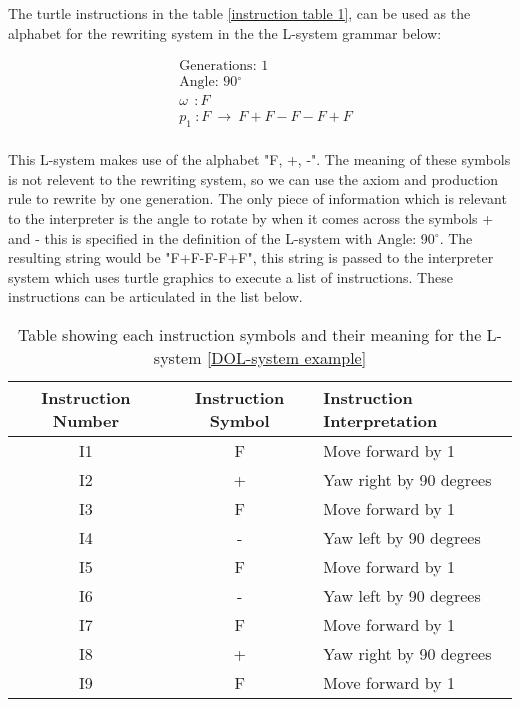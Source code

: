\begin{flushleft}
\vspace{5mm}

The turtle instructions in the table \ref{instruction table 1}, can be used as the alphabet for the rewriting system in the the L-system grammar below:

\begin{equation} \label{DOL-system example}
\begin{aligned}
	&\text{Generations: 1}\\
	&\text{Angle: 90$^{\circ}$}\\
	&\omega~~ : F \\
	&p_1~ :  F~ \rightarrow~ F+F-F-F+F\\
\end{aligned}
\end{equation}

\vspace{5mm}

This L-system makes use of the alphabet "F, +, -". The meaning of these symbols is not relevent to the rewriting system, so we can use the axiom and production rule to rewrite by one generation. The only piece of information which is relevant to the interpreter is the angle to rotate by when it comes across the symbols + and - this is specified in the definition of the L-system with Angle: 90$^{\circ}$. The resulting string would be "F+F-F-F+F", this string is passed to the interpreter system which uses turtle graphics to execute a list of instructions. These instructions can be articulated in the list below.

\vspace{5mm}

\begin{table}[h!]
\begin{tabular}{ | c | c | l | }
\hline
	 	Instruction Number & Instruction Symbol & Instruction Interpretation \\  
\hline
\hline
	I1 						& F & Move forward by 1\\
\hline
	I2						& + & Yaw right by 90 degrees\\
\hline
	I3						& F & Move forward by 1\\
\hline
	I4						& - & Yaw left by 90 degrees \\
\hline
	I5						& F & Move forward by 1\\
\hline
	I6 						& - & Yaw left by 90 degrees \\
\hline
	I7 						& F & Move forward by 1\\
\hline
	I8 						& + & Yaw right by 90 degrees\\
\hline
	I9 						& F & Move forward by 1\\
\hline
\end{tabular}
\caption{Table showing each instruction symbols and their meaning for the L-system \ref{DOL-system example}}
\label{Instruction Interpretation}
\end{table}
\FloatBarrier


\end{flushleft}
